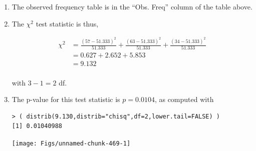 \documentclass[10pt,openany]{book}\usepackage[]{graphicx}\usepackage[]{color}
\makeatletter
\newenvironment{kframe}{%
 \def\at@end@of@kframe{}%
 \ifinner\ifhmode%
  \def\at@end@of@kframe{\end{minipage}}%
  \begin{minipage}{\columnwidth}%
 \fi\fi%
 \def\FrameCommand##1{\hskip\@totalleftmargin \hskip-\fboxsep
 \colorbox{shadecolor}{##1}\hskip-\fboxsep
     \hskip-\linewidth \hskip-\@totalleftmargin \hskip\columnwidth}%
 \MakeFramed {\advance\hsize-\width
   \@totalleftmargin\z@ \linewidth\hsize
   \@setminipage}}%
 {\par\unskip\endMakeFramed%
 \at@end@of@kframe}
\newenvironment{knitrout}{}{} %
\makeatother
\begin{document}
\begin{itemize}
\begin{enumerate}
\begin{center}
        \end{center}
    \item The observed frequency table is in the ``Obs. Freq'' column of the table above.
    \item The $\chi^{2}$ test statistic is thus,
      \begin{center}
        \[  \begin{split}
          \chi^{2} &= \frac{(57-51.333)^{2}}{51.333} + \frac{(63-51.333)^{2}}{51.333} + \frac{(34-51.333)^{2}}{51.333} \\
          &= 0.627 + 2.652 + 5.853 \\
          & = 9.132 \\
        \end{split}  \]
      \end{center}
      with $3-1=2$ df.
    \item The p-value for this test statistic is $p=0.0104$, as computed with
\begin{knitrout}
\color{fgcolor}\begin{kframe}
\begin{verbatim}
> ( distrib(9.130,distrib="chisq",df=2,lower.tail=FALSE) )
[1] 0.01040988
\end{verbatim}
\end{kframe}

{\centering \texttt{[image: Figs/unnamed-chunk-469-1]} 

}




\end{knitrout}
\end{enumerate}
\end{itemize}
\end{document}
